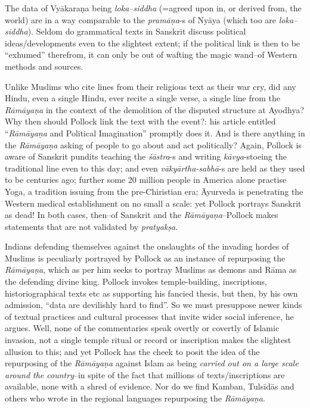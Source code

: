 The data of Vyākaraṇa being \textit{loka–siddha} (=agreed upon in, or derived from, the world) are in a way comparable to the \textit{pramāṇa}-s of Nyāya (which too are \textit{loka–siddha}). Seldom do grammatical texts in Sanskrit discuss political ideas/developments even to the slightest extent; if the political link is then to be “exhumed” therefrom, it can only be out of wafting the magic wand–of Western methods and sources.

Unlike Muslims who cite lines from their religious text as their war cry, did any Hindu, even a single Hindu, ever recite a single verse, a single line from the \textit{Rāmāyaṇa} in the context of the demolition of the disputed structure at Ayodhya? Why then should Pollock link the text with the event?: his article entitled “\textit{Rāmāyaṇa} and Political Imagination” promptly does it. And is there anything in the \textit{Rāmāyaṇa} asking of people to go about and act politically? Again, Pollock is aware of Sanskrit pundits teaching the \textit{śāstra}-s and writing \textit{kāvya}-s\break toeing the traditional line even to this day; and even \textit{vākyārtha-sabhā}-s are held as they used to be centuries ago; further some 20 million people in America alone practise Yoga, a tradition issuing from the pre-Chiristian era; Āyurveda is penetrating the Western medical establishment on no small a scale: yet Pollock portrays Sanskrit as dead! In both cases, then–of Sanskrit and the \textit{Rāmāyaṇa}–Pollock makes statements that are not validated by \textit{pratyakṣa}.

Indians defending themselves against the onslaughts of the invading hordes of Muslims is peculiarly portrayed by Pollock as an instance of repurposing the \textit{Rāmāyaṇa}, which as per him seeks to portray Muslims as demons and Rāma as the defending divine king. Pollock invokes temple-building, inscriptions, historiographical texts etc as supporting his fancied thesis, but then, by his own admission, “data are devilishly hard to find”. So we must presuppose newer kinds of textual practices and cultural processes that invite wider social inference, he argues. Well, none of the commentaries speak overtly or covertly of Islamic invasion, not a single temple ritual or record or inscription makes the slightest allusion to this; and yet Pollock has the cheek to posit the idea of the repurposing of the \textit{Rāmāyaṇa} against Islam as being \textit{carried out on a large scale around the country}–in spite of the fact that millions of texts/inscriptions are available, none with a shred of evidence. Nor do we find Kamban, Tulsīdās and others who wrote in the regional languages repurposing the \textit{Rāmāyaṇa}.

